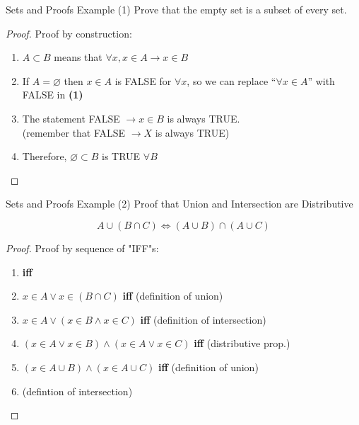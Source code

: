 \begin{frame}{Sets and Proofs Example (1)}
{Prove that the empty set is a subset of every set.}

  \begin{proof}
    Proof by construction:

  \begin{enumerate}

  \item $A \subset B$ means that $\forall x, x \in A \rightarrow x \in B$\bigskip

  \item If $A = \varnothing$ then $x \in A$ is FALSE for $\forall x$, so we can replace ``$\forall x \in A$'' with FALSE in {\bf (1)}\bigskip

\item The statement FALSE $\rightarrow x \in B$ is always TRUE.\\ \hfill (remember that FALSE $\rightarrow X$ is always TRUE)\bigskip

  \item Therefore, $\varnothing \subset B$ is TRUE $\forall B$
  \end{enumerate}
  \end{proof}
\end{frame}


\begin{frame}{Sets and Proofs Example (2)}
{Proof that Union and Intersection are Distributive}

  \begin{equation*}
    A \cup (B \cap C) \iff (A \cup B) \cap (A \cup C)
  \end{equation*}

  \begin{proof}
    Proof by sequence of "IFF"s:
    \begin{enumerate}
    \item {} {\bf iff}
    \item $x \in A \lor x \in (B \cap C)$ {\bf iff} \hfill (definition of union)
    \item $x \in A \lor (x \in B \land x \in C)$ {\bf iff} \hfill
      (definition of intersection)
    \item $(x \in A \lor x \in B) \land (x\in A \lor x \in C)$ {\bf
      iff} \hfill (distributive prop.)
    \item $(x \in A\cup B) \land (x \in A\cup C)$ {\bf iff}\hfill
      (definition of union)
    \item {}  \hfill
      (defintion of intersection)

    \end{enumerate}
  \end{proof}
\end{frame}


